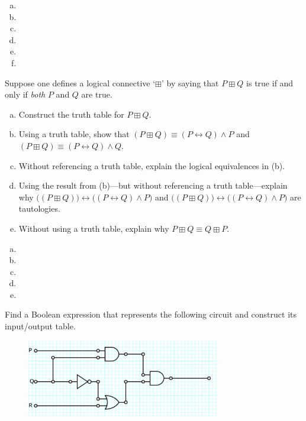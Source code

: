 \documentclass[11pt,letterpaper]{article}
\begin{document}
\sol
\begin{enumerate}[(a)]
\item 
\item 
\item 
\item 
\item 
\item 
\end{enumerate}



\newpage



 Suppose one defines a logical connective `$\boxplus$' by saying that $P \boxplus Q$ is true if and only if \textit{both} $P$ and $Q$ are true.
	\begin{enumerate}[(a)]
	\item Construct the truth table for $P \boxplus Q$.
	\item Using a truth table, show that $(P \boxplus Q) \equiv (P \leftrightarrow Q) \wedge P$ and $(P \boxplus Q) \equiv (P \leftrightarrow Q) \wedge Q$.
	\item Without referencing a truth table, explain the logical equivalences in (b).
	\item Using the result from (b)---but without referencing a truth table---explain why $\big( (P \boxplus Q) \big) \leftrightarrow \big( (P \leftrightarrow Q) \wedge P \big)$ and $\big( (P \boxplus Q) \big) \leftrightarrow \big( (P \leftrightarrow Q) \wedge P \big)$ are tautologies. 
	\item Without using a truth table, explain why $P \boxplus Q \equiv Q \boxplus P$.
	\end{enumerate} \pspace

\sol 
\begin{enumerate}[(a)]
\item 
\item 
\item 
\item 
\item 
\end{enumerate}



\newpage



 Find a Boolean expression that represents the following circuit and construct its input/output table.
	\begin{figure}[!ht]
	\centering
	\includegraphics[width=0.75\textwidth]{circuit.png}
	\end{figure} \pspace
\end{document}
